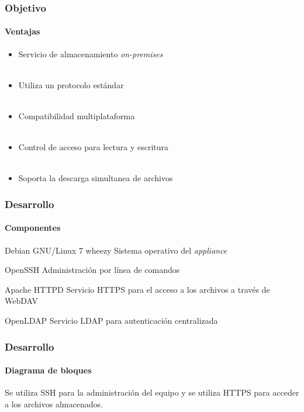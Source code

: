 \documentclass{beamer}
\begin{document}
\begin{frame}
\frametitle{Objetivo}
\framesubtitle{Ventajas}
\justifying

\begin{itemize}
\justifying
  \item Servicio de almacenamiento \textit{on-premises}
\\~\\
  \item Utiliza un protocolo est\'{a}ndar
\\~\\
  \item Compatibilidad multiplataforma
\\~\\
  \item Control de acceso para lectura y escritura
\\~\\
  \item Soporta la descarga simultanea de archivos
\end{itemize}

\end{frame}

\begin{frame}
\frametitle{Desarrollo}
\framesubtitle{Componentes}
\justifying

\begin{block}{Debian GNU/Linux 7 \guillemotleft wheezy\guillemotright}
 Sistema operativo del \textsl{appliance}
\end{block}
\begin{block}{\textup{OpenSSH}}
 Administraci\'{o}n por l\'{i}nea de comandos
\end{block}
\begin{block}{Apache \textup{HTTPD}}
 Servicio \textup{HTTPS} para el acceso a los archivos a trav\'{e}s de \textup{WebDAV}
\end{block}
\begin{block}{\textup{OpenLDAP}}
 Servicio LDAP para autenticaci\'{o}n centralizada
\end{block}

\end{frame}

\begin{frame}
\frametitle{Desarrollo}
\framesubtitle{Diagrama de bloques}

Se utiliza \textup{SSH} para la administraci\'{o}n del equipo y se utiliza \textup{HTTPS} para acceder a los archivos almacenados.

\vspace{1.7em}

\centering
 {
  
 }

\end{frame}
\end{document}
